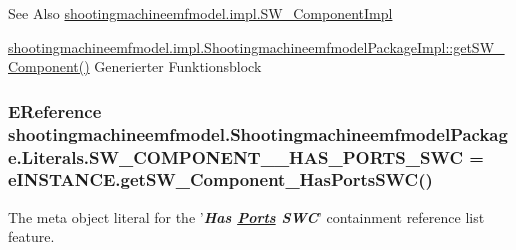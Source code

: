 \begin{DoxySeeAlso}{See Also}
\hyperlink{classshootingmachineemfmodel_1_1impl_1_1_s_w___component_impl}{shootingmachineemfmodel.\-impl.\-S\-W\-\_\-\-Component\-Impl} 

\hyperlink{classshootingmachineemfmodel_1_1impl_1_1_shootingmachineemfmodel_package_impl_aea506b8692fe0c081070fce6bd9295f7}{shootingmachineemfmodel.\-impl.\-Shootingmachineemfmodel\-Package\-Impl\-::get\-S\-W\-\_\-\-Component()} Generierter Funktionsblock 
\end{DoxySeeAlso}
\hypertarget{interfaceshootingmachineemfmodel_1_1_shootingmachineemfmodel_package_1_1_literals_acce8f7d770b974806d1073dc91d451ea}{
\subsubsection[{S\-W\-\_\-\-C\-O\-M\-P\-O\-N\-E\-N\-T\-\_\-\-\_\-\-H\-A\-S\-\_\-\-P\-O\-R\-T\-S\-\_\-\-S\-W\-C}]{\setlength{\rightskip}{0pt plus 5cm}E\-Reference shootingmachineemfmodel.\-Shootingmachineemfmodel\-Package.\-Literals.\-S\-W\-\_\-\-C\-O\-M\-P\-O\-N\-E\-N\-T\-\_\-\-\_\-\-H\-A\-S\-\_\-\-P\-O\-R\-T\-S\-\_\-\-S\-W\-C = e\-I\-N\-S\-T\-A\-N\-C\-E.\-get\-S\-W\-\_\-\-Component\-\_\-\-Has\-Ports\-S\-W\-C()}}\label{interfaceshootingmachineemfmodel_1_1_shootingmachineemfmodel_package_1_1_literals_acce8f7d770b974806d1073dc91d451ea}
The meta object literal for the '{\itshape {\bfseries Has \hyperlink{interfaceshootingmachineemfmodel_1_1_ports}{Ports} S\-W\-C}}' containment reference list feature.

